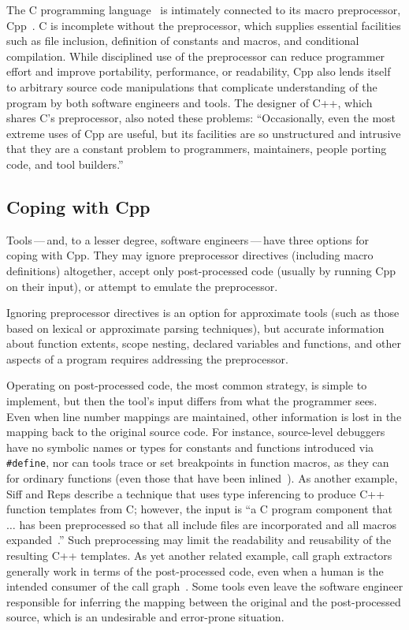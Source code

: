 \documentclass[11pt]{article}
\begin{document}
The C programming language~\cite{ansi} is intimately connected to its macro
preprocessor, Cpp~\cite[Ch.~3]{Harbison91}.   C is incomplete without the
preprocessor, which supplies essential 
facilities such as file inclusion, definition of constants and macros, and
conditional compilation.
While disciplined use of  the preprocessor can reduce programmer effort and 
improve portability, performance, or readability, Cpp also lends itself to
arbitrary source code manipulations that complicate understanding of the
program by both software engineers and tools.  The designer of C++, which
shares C's preprocessor, also noted these problems:
``Occasionally, even the most extreme uses of Cpp are useful, but its
facilities are so unstructured and intrusive that they are a constant
problem to programmers, maintainers, people porting code, and tool
builders.''~\cite[p.~424]{Stroustrup-DesignEvolution}

\subsection{Coping with Cpp}

Tools\,---\,and, to a lesser degree, software engineers\,---\,have three
options for coping with Cpp.    They may ignore preprocessor directives
(including macro definitions) altogether, accept only post-processed code
(usually by running Cpp on their input), or attempt to emulate the
preprocessor.

Ignoring preprocessor directives is an option for approximate tools (such
as those based on lexical or approximate parsing techniques), but accurate
information about function extents, scope nesting, declared variables and
functions, and other aspects of a program requires addressing the
preprocessor.

Operating on post-processed code, the most common strategy, is simple to
implement, but then the tool's input differs from what the
programmer sees.  Even when line number mappings are maintained, other
information is lost in the mapping back to the original source code.
For instance, source-level debuggers have no symbolic names or types
for constants and functions introduced via {\tt \#define}, nor can tools
trace or set breakpoints in function macros, as they can for ordinary
functions (even those that have been inlined~\cite{Zellweger83:TR}).
As another example, Siff
and Reps describe a technique that uses type inferencing to produce
C++ function templates from C; however, the input is ``a C program
component that $\ldots$ has been preprocessed so that all include
files are incorporated and all macros
expanded~\cite[p.~145]{Siff-fse96}.''  Such preprocessing may limit
the readability and reusability of the resulting C++ templates.  As
yet another related example, call graph extractors generally work in
terms of the post-processed code, even when a human is the intended
consumer of the call graph~\cite{Murphy-icse18}.  Some tools even
leave the software engineer responsible for inferring the mapping between the
original and the post-processed source, which is an undesirable and
error-prone situation.
\end{document}
